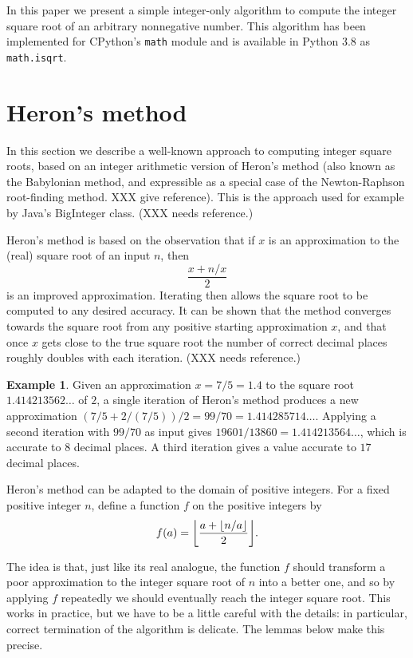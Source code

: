 \documentclass[a4paper]{article}
\DeclarePairedDelimiter\floor{\lfloor}{\rfloor}
\theoremstyle{plain}
\theoremstyle{definition}
\newtheorem{example}[theorem]{Example}
\begin{document}
In this paper we present a simple integer-only algorithm to compute the integer
square root of an arbitrary nonnegative number. This algorithm has been
implemented for CPython's \lstinline{math} module and is available in Python
3.8 as \lstinline{math.isqrt}.

\section{Heron's method}

In this section we describe a well-known approach to computing integer square
roots, based on an integer arithmetic version of Heron's method (also known
as the Babylonian method, and expressible as a special case of the
Newton-Raphson root-finding method. XXX give reference). This is the approach
used for example by Java's BigInteger class. (XXX needs reference.)

Heron's method is based on the observation that if $x$ is an approximation to
the (real) square root of an input $n$, then
$$\frac{x + n/x}2$$ is an improved approximation. Iterating then allows the
square root to be computed to any desired accuracy. It can be shown that the
method converges towards the square root from any positive starting
approximation $x$, and that once $x$ gets close to the true square root the
number of correct decimal places roughly doubles with each iteration. (XXX
needs reference.)

\begin{example}
  Given an approximation $x = 7/5 = 1.4$ to the square root $1.414213562\dots$
  of $2$, a single iteration of Heron's method produces a new approximation
  $(7/5 + 2/(7/5))/2 = 99/70 = 1.414285714\dots$. Applying a second iteration
  with $99/70$ as input gives $19601/13860 = 1.414213564\dots$, which is
  accurate to $8$ decimal places. A third iteration gives a value accurate to
  $17$ decimal places.
\end{example}

Heron's method can be adapted to the domain of positive integers. For a fixed
positive integer $n$, define a function $f$ on the positive integers by
$$f(a) = \floor*{\frac{a + \floor{n/a}}2}.$$

The idea is that, just like its real analogue, the function $f$ should
transform a poor approximation to the integer square root of $n$ into a better
one, and so by applying $f$ repeatedly we should eventually reach the integer
square root. This works in practice, but we have to be a little careful with
the details: in particular, correct termination of the algorithm is delicate.
The lemmas below make this precise.
\end{document}
